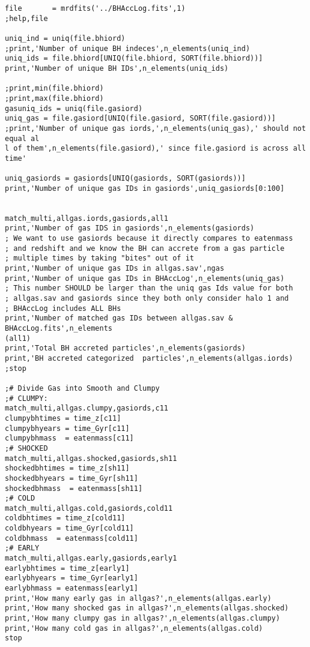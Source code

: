 \documentclass[12pt,headA,chapB]{fiskthesis}
\begin{document}
\begin{verbatim}
file       = mrdfits('../BHAccLog.fits',1)
;help,file

uniq_ind = uniq(file.bhiord)
;print,'Number of unique BH indeces',n_elements(uniq_ind)
uniq_ids = file.bhiord[UNIQ(file.bhiord, SORT(file.bhiord))]
print,'Number of unique BH IDs',n_elements(uniq_ids)

;print,min(file.bhiord)
;print,max(file.bhiord)
gasuniq_ids = uniq(file.gasiord)
uniq_gas = file.gasiord[UNIQ(file.gasiord, SORT(file.gasiord))]
;print,'Number of unique gas iords,',n_elements(uniq_gas),' should not equal al
l of them',n_elements(file.gasiord),' since file.gasiord is across all time'

uniq_gasiords = gasiords[UNIQ(gasiords, SORT(gasiords))]
print,'Number of unique gas IDs in gasiords',uniq_gasiords[0:100]


match_multi,allgas.iords,gasiords,all1
print,'Number of gas IDS in gasiords',n_elements(gasiords)
; We want to use gasiords because it directly compares to eatenmass
; and redshift and we know the BH can accrete from a gas particle
; multiple times by taking "bites" out of it
print,'Number of unique gas IDs in allgas.sav',ngas
print,'Number of unique gas IDs in BHAccLog',n_elements(uniq_gas)
; This number SHOULD be larger than the uniq gas Ids value for both
; allgas.sav and gasiords since they both only consider halo 1 and
; BHAccLog includes ALL BHs
print,'Number of matched gas IDs between allgas.sav & BHAccLog.fits',n_elements
(all1)
print,'Total BH accreted particles',n_elements(gasiords)
print,'BH accreted categorized  particles',n_elements(allgas.iords)
;stop

;# Divide Gas into Smooth and Clumpy
;# CLUMPY:
match_multi,allgas.clumpy,gasiords,c11
clumpybhtimes = time_z[c11]
clumpybhyears = time_Gyr[c11]
clumpybhmass  = eatenmass[c11]
;# SHOCKED
match_multi,allgas.shocked,gasiords,sh11
shockedbhtimes = time_z[sh11]
shockedbhyears = time_Gyr[sh11]
shockedbhmass  = eatenmass[sh11]
;# COLD
match_multi,allgas.cold,gasiords,cold11
coldbhtimes = time_z[cold11]
coldbhyears = time_Gyr[cold11]
coldbhmass  = eatenmass[cold11]
;# EARLY
match_multi,allgas.early,gasiords,early1
earlybhtimes = time_z[early1]
earlybhyears = time_Gyr[early1]
earlybhmass = eatenmass[early1]
print,'How many early gas in allgas?',n_elements(allgas.early)
print,'How many shocked gas in allgas?',n_elements(allgas.shocked)
print,'How many clumpy gas in allgas?',n_elements(allgas.clumpy)
print,'How many cold gas in allgas?',n_elements(allgas.cold)
stop


\end{verbatim}
\end{document}
